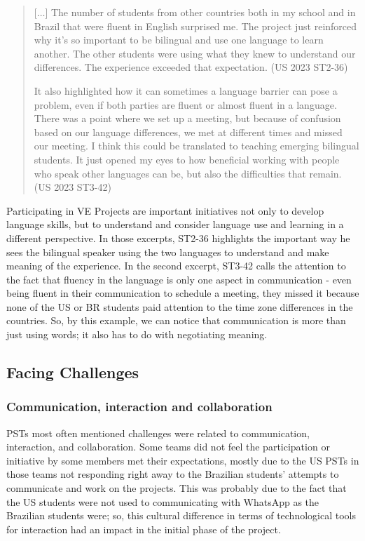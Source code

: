 \begin{quote}
[$\ldots$] The number of students from other countries both in my
school and in Brazil that were fluent in English surprised me. The
project just reinforced why it’s so important to be
bilingual and use one language to learn another. The other students were
using what they knew to understand our differences. The experience
exceeded that expectation. (US 2023 ST2-36)
	
It also highlighted how it can sometimes a language barrier can
pose a problem, even if both parties are fluent or almost fluent in a
language. There was a point where we set up a meeting, but because of
confusion based on our language differences, we met at different times
and missed our meeting. I think this could be translated to teaching
emerging bilingual students. It just opened my eyes to how beneficial
working with people who speak other languages can be, but also the
difficulties that remain. (US 2023 ST3-42)
\end{quote}

Participating in VE Projects are important initiatives not only to
develop language skills, but to understand and consider language use and
learning in a different perspective. In those excerpts, ST2-36
highlights the important way he sees the bilingual speaker using the two
languages to understand and make meaning of the experience. In the
second excerpt, ST3-42 calls the attention to the fact that fluency in
the language is only one aspect in communication - even being fluent in
their communication to schedule a meeting, they missed it because none
of the US or BR students paid attention to the time zone differences in
the countries. So, by this example, we can notice that communication is
more than just using words; it also has to do with negotiating meaning.

\subsection{Facing Challenges} \label{sub-sec-facing}
\subsubsection{Communication, interaction and collaboration}\label{sub-sub-sec-communication}

PSTs most often mentioned challenges were related to communication,
interaction, and collaboration. Some teams did not feel the
participation or initiative by some members met their expectations,
mostly due to the US PSTs in those teams not responding right away to
the Brazilian students' attempts to communicate and work on the
projects. This was probably due to the fact that the US students were
not used to communicating with WhatsApp as the Brazilian students were;
so, this cultural difference in terms of technological tools for
interaction had an impact in the initial phase of the project.

